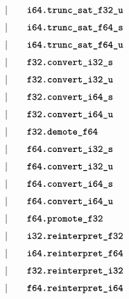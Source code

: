\begin{alignat*}{9}
    &&       &&\quad | &\quad && \textbf{\texttt{i64.trunc\textunderscore sat\textunderscore f32\textunderscore u}} \quad &&  \\[1mm]
    &&       &&\quad | &\quad && \textbf{\texttt{i64.trunc\textunderscore sat\textunderscore f64\textunderscore s}} \quad &&  \\[1mm]
    &&       &&\quad | &\quad && \textbf{\texttt{i64.trunc\textunderscore sat\textunderscore f64\textunderscore u}} \quad &&  \\[1mm]
    &&       &&\quad | &\quad && \textbf{\texttt{f32.convert\textunderscore i32\textunderscore s}} \quad &&  \\[1mm]
    &&       &&\quad | &\quad && \textbf{\texttt{f32.convert\textunderscore i32\textunderscore u}} \quad &&  \\[1mm]
    &&       &&\quad | &\quad && \textbf{\texttt{f32.convert\textunderscore i64\textunderscore s}} \quad &&  \\[1mm]
    &&       &&\quad | &\quad && \textbf{\texttt{f32.convert\textunderscore i64\textunderscore u}} \quad &&  \\[1mm]
    &&       &&\quad | &\quad && \textbf{\texttt{f32.demote\textunderscore f64}} \quad &&  \\[1mm]
    &&       &&\quad | &\quad && \textbf{\texttt{f64.convert\textunderscore i32\textunderscore s}} \quad &&  \\[1mm]
    &&       &&\quad | &\quad && \textbf{\texttt{f64.convert\textunderscore i32\textunderscore u}} \quad &&  \\[1mm]
    &&       &&\quad | &\quad && \textbf{\texttt{f64.convert\textunderscore i64\textunderscore s}} \quad &&  \\[1mm]
    &&       &&\quad | &\quad && \textbf{\texttt{f64.convert\textunderscore i64\textunderscore u}} \quad &&  \\[1mm]
    &&       &&\quad | &\quad && \textbf{\texttt{f64.promote\textunderscore f32}} \quad &&  \\[1mm]
    &&       &&\quad | &\quad && \textbf{\texttt{i32.reinterpret\textunderscore f32}} \quad &&  \\[1mm]
    &&       &&\quad | &\quad && \textbf{\texttt{i64.reinterpret\textunderscore f64}} \quad &&  \\[1mm]
    &&       &&\quad | &\quad && \textbf{\texttt{f32.reinterpret\textunderscore i32}} \quad &&  \\[1mm]
    &&       &&\quad | &\quad && \textbf{\texttt{f64.reinterpret\textunderscore i64}} \quad &&  \\[1mm]
\end{alignat*}

